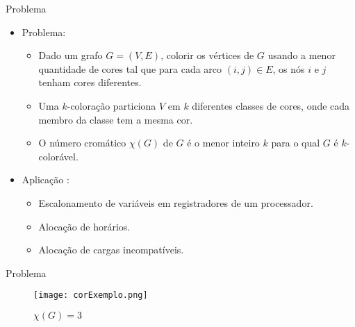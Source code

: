	\begin{frame}{Problema} %
		\begin{itemize}
        	\item Problema:
            
            \begin{itemize}

                \item Dado um grafo $G = (V, E)$, colorir os vértices de $G$ usando a menor quantidade de cores tal que para cada arco $(i, j) \in E$, os nós $i$ e $j$ tenham cores diferentes.

                \bigskip

                \item Uma $k$-coloração particiona $V$ em $k$ diferentes classes de cores, onde cada membro da classe tem a mesma cor.

                \bigskip

                \item O número cromático $\chi(G)$ de $G$ é o menor inteiro $k$ para o qual $G$ é $k$-colorável.

            \end{itemize}
            
            
            \bigskip
            
            
            \item Aplicação  \cite{Ziviani}:
            \begin{itemize}

                \item Escalonamento de variáveis em registradores de um processador.

                \bigskip

                \item Alocação de horários.

                \bigskip

                \item Alocação de cargas incompatíveis.

            \end{itemize}
            
        \end{itemize}
		
	\end{frame}
	
	\begin{frame}{Problema} %
			
		\begin{figure}[!htb]
			\centering
			\texttt{[image: corExemplo.png]}
			\caption{$\chi(G)=3$}
			\label{fig:grafoProblema}
		\end{figure}
		
	\end{frame}



